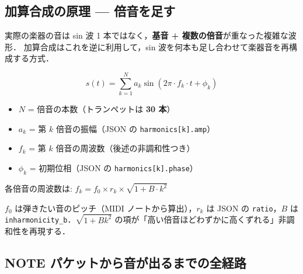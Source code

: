 \documentclass[uplatex,dvipdfmx,a4paper,10pt]{jsarticle}
\begin{document}
\subsection{加算合成の原理 — 倍音を足す}

実際の楽器の音は sin 波 1 本ではなく，\textbf{基音 + 複数の倍音}が重なった複雑な波形．
加算合成はこれを逆に利用して，sin 波を何本も足し合わせて楽器音を再構成する方式．

$$
s(t) = \sum_{k=1}^{N} a_k \sin(2\pi \cdot f_k \cdot t + \phi_k)
$$

\begin{itemize}
  \item $N$ = 倍音の本数（トランペットは \textbf{30 本}）
  \item $a_k$ = 第 $k$ 倍音の振幅（JSON の \texttt{harmonics[k].amp}）
  \item $f_k$ = 第 $k$ 倍音の周波数（後述の非調和性つき）
  \item $\phi_k$ = 初期位相（JSON の \texttt{harmonics[k].phase}）
\end{itemize}

各倍音の周波数は: $f_k = f_0 \times r_k \times \sqrt{1 + B \cdot k^2}$

$f_0$ は弾きたい音のピッチ（MIDI ノートから算出），$r_k$ は JSON の \texttt{ratio}，$B$ は \texttt{inharmonicity\_b}．$\sqrt{1+Bk^2}$ の項が「高い倍音ほどわずかに高くずれる」非調和性を再現する．

\subsection{NOTE パケットから音が出るまでの全経路}
\end{document}
